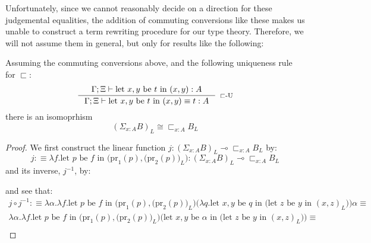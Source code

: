 Unfortunately, since we cannot reasonably decide on a direction for these judgemental equalities, the addition of commuting conversions like these makes us unable to construct a term rewriting procedure for our type theory. Therefore, we will not assume them in general, but only for results like the following:
\begin{thm}\label{L-subset}
  Assuming the commuting conversions above, and the following uniqueness rule for $\sqsubset$:
  \[
    \inference{\Gamma;\Xi \vdash \text{let $x, y$ be $t$ in $(x, y) : A$}}
      {\Gamma;\Xi \vdash \text{let $x, y$ be $t$ in $(x, y) \equiv t : A$}}[$\sqsubset$-U]
  \]
  there is an isomoprhism
  \[
    (\Sigma_{x :A}B)_L \cong \sqsubset_{x:A}B_L
  \]
  
  \begin{proof} 
We first construct the linear function $j : (\Sigma_{x :A}B)_L \multimap \sqsubset_{x:A}B_L$ by:\\
\[
  j :\equiv \lambda f. \text{let $p$ be $f$ in $\Big (\text{pr}_1(p), \big  (\text{pr}_2(p)\big )_L\Big)$} : (\Sigma_{x :A}B)_L \multimap \sqsubset_{x :A}B_L
\]
and its inverse, $j^{-1}$, by:
\begin{prooftree}
\end{prooftree}
and see that:
\[
  \begin{split}
    j \circ j^{-1} : \equiv \lambda \alpha. \lambda f. \text{let $p$ be $f$ in $\Big (\text{pr}_1(p), \big  (\text{pr}_2(p)\big )_L\Big)$} \big (\lambda q. \text{let $x, y$ be $q$ in (let $z$ be $y$ in $(x, z)_L$)} \big ) \alpha \equiv \\
    \lambda \alpha. \lambda f. \text{let $p$ be $f$ in $\Big (\text{pr}_1(p), \big  (\text{pr}_2(p)\big )_L\Big)$} \big (\text{let $x, y$ be $\alpha$ in (let $z$ be $y$ in $(x, z)_L$)} \big ) \equiv\\

\end{split}\]
\end{proof}
\end{thm}
